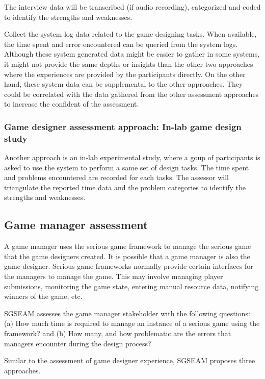\documentclass[11pt,oneside]{book}
\begin{document}
The interview data will be transcribed (if audio recording), categorized and coded to identify the
strengths and weaknesses.

Collect the system log data related to the game designing tasks. When
available, the time spent and error encountered can be queried from the system logs. Although these
system generated data might be easier to gather in some systems, it might not provide the same
depths or insights than the other two approaches where the experiences are provided by the
participants directly. On the other hand, these system data can be supplemental to the other
approaches. They could be correlated with the data gathered from the other assessment approaches
 to increase the confident of the assessment.

\subsubsection{Game designer assessment approach: In-lab game design study}
\label{In-lab game design study}

Another approach is an in-lab experimental study, where a
goup of participants is asked to use the system to perform a same set of design tasks. The time
spent and problems encountered are recorded for each tasks. The assessor will triangulate the
reported time data and the problem categories to identify the strengths and weaknesses.

\subsection{Game manager assessment}

A game manager uses the serious game framework to manage the serious game that the game
designers created. It is possible that a game manager is also the game designer.
Serious game frameworks normally provide certain interfaces for the managers to manage the
game. This may involve managing player submissions, monitoring the game state, entering
manual resource data, notifying winners of the game, etc.

SGSEAM assesses the game manager stakeholder with the following questions: (a) How much time is
required to manage an instance of a serious game using the framework? and (b) How many,
and how problematic are the errors that managers encounter during the design process?

Similar to the assessment of game designer experience, SGSEAM proposes three approaches. 
\end{document}
